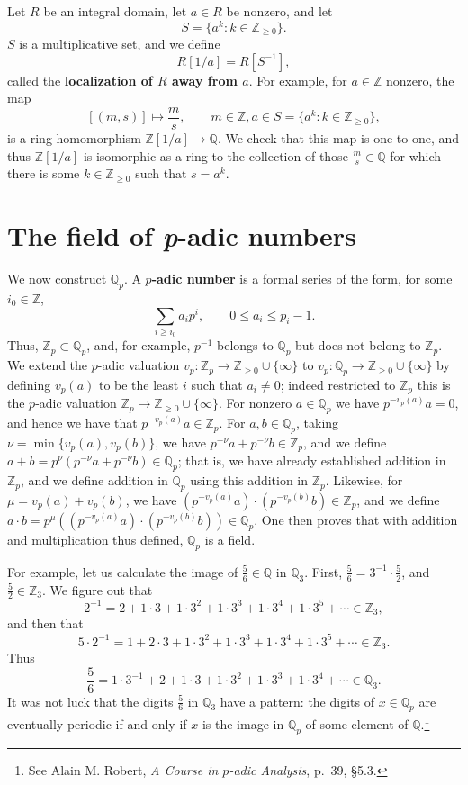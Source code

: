 \documentclass{article}
\theoremstyle{definition}
\theoremstyle{definition}
\begin{document}
Let $R$ be  an integral domain, let $a \in R$ be nonzero, and let
\[
S=\{a^k: k \in \mathbb{Z}_{\geq 0}\}.
\]
$S$ is a multiplicative set, and we define
\[
R[1/a] = R[S^{-1}],
\] 
called the \textbf{localization of $R$ away from $a$}. 
For example, for $a \in \mathbb{Z}$ nonzero, the map
\[
[(m,s)] \mapsto \frac{m}{s}, \qquad m \in \mathbb{Z}, a \in S=\{a^k: k \in \mathbb{Z}_{\geq 0}\},
\]
is a ring homomorphism $\mathbb{Z}[1/a] \to \mathbb{Q}$. We check that this map is one-to-one, and thus
$\mathbb{Z}[1/a]$ is isomorphic as a ring to the collection of those 
$\frac{m}{s} \in \mathbb{Q}$ for which there is some $k \in \mathbb{Z}_{\geq 0}$ such that $s=a^k$. 



\section{The field of {\em p}-adic numbers}
We now construct $\mathbb{Q}_p$. A \textbf{$p$-adic number} is a formal series of the form, for some
$i_0 \in \mathbb{Z}$, 
\[
\sum_{i \geq i_0} a_i p^i, \qquad 0 \leq a_i  \leq p_i-1.
\]
Thus, $\mathbb{Z}_p \subset \mathbb{Q}_p$, and, for example, $p^{-1}$ belongs to $\mathbb{Q}_p$ but
does not belong to $\mathbb{Z}_p$. 
We extend the $p$-adic valuation $v_p:\mathbb{Z}_p \to \mathbb{Z}_{\geq 0} \cup \{\infty\}$
to $v_p:\mathbb{Q}_p \to \mathbb{Z}_{\geq 0} \cup \{\infty\}$ by defining $v_p(a)$ to be the least 
$i$ such that $a_i \neq 0$; indeed restricted to $\mathbb{Z}_p$ this is the $p$-adic valuation 
$\mathbb{Z}_p \to \mathbb{Z}_{\geq 0} \cup \{\infty\}$. For nonzero $a \in \mathbb{Q}_p$ we have 
$p^{-v_p(a)} a = 0$, and hence we have that $p^{-v_p(a)} a \in \mathbb{Z}_p$. For $a,b \in \mathbb{Q}_p$, taking
$\nu = \min\{v_p(a),v_p(b)\}$, we have $p^{-\nu}a+p^{-\nu}b \in \mathbb{Z}_p$, and we define
$a+b = p^{\nu} (p^{-\nu}a+p^{-\nu}b) \in \mathbb{Q}_p$; that is, we have already established addition in $\mathbb{Z}_p$, and we define
addition in $\mathbb{Q}_p$ using this addition in $\mathbb{Z}_p$. Likewise, for $\mu=v_p(a)+v_p(b)$, we have
$(p^{-v_p(a)}a)\cdot (p^{-v_p(b)}b) \in \mathbb{Z}_p$, and we define $a\cdot b = p^{\mu} ((p^{-v_p(a)}a)\cdot (p^{-v_p(b)}b)) \in 
\mathbb{Q}_p$. One then proves that with addition and multiplication thus defined, $\mathbb{Q}_p$ is a field.

For example, let us calculate the image of $\frac{5}{6} \in \mathbb{Q}$ in $\mathbb{Q}_3$. First, $\frac{5}{6}=3^{-1} \cdot \frac{5}{2}$,
and $\frac{5}{2} \in \mathbb{Z}_3$. We figure out that
\[
2^{-1}=2+1\cdot 3+1\cdot 3^2+1\cdot 3^3+1\cdot 3^4+1\cdot 3^5+\cdots \in \mathbb{Z}_3,
\]
and then that
\[
5\cdot 2^{-1} = 1+2\cdot 3+1\cdot 3^2+1\cdot 3^3+1\cdot 3^4+1\cdot 3^5+\cdots \in \mathbb{Z}_3.
\]
Thus
\[
\frac{5}{6} =  1\cdot 3^{-1} + 2 + 1\cdot 3 + 1\cdot 3^2+1\cdot 3^3+1\cdot 3^4+\cdots \in \mathbb{Q}_3.
\]
It was not luck that the digits
 $\frac{5}{6}$ in $\mathbb{Q}_3$ have a pattern: the digits of $x \in \mathbb{Q}_p$ are eventually
 periodic if and only if $x$ is the image in $\mathbb{Q}_p$ of some element of $\mathbb{Q}$.\footnote{See Alain M. Robert, {\em A Course in $p$-adic Analysis},
p.~39, \S 5.3.}
\end{document}
